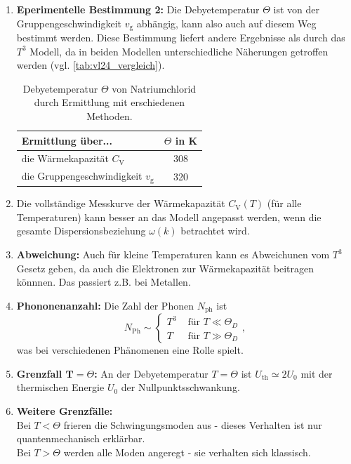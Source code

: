\begin{enumerate}
\begin{table}[H]
\begin{tabular}{ccc}
				\bottomrule
			\end{tabular}
		\end{table}
	\item \textbf{Eperimentelle Bestimmung 2:} Die Debyetemperatur $\Theta$ ist von der Gruppengeschwindigkeit $v_\mathrm g$ abhängig, kann also auch auf diesem Weg bestimmt werden. 
		Diese Bestimmung liefert andere Ergebnisse als durch das $T^3$ Modell, da in beiden Modellen unterschiedliche Näherungen getroffen werden (vgl. \autoref{tab:vl24_vergleich}).
		\begin{table}[H]
			\centering
			\caption{Debyetemperatur $\Theta$ von Natriumchlorid  durch Ermittlung mit erschiedenen Methoden.}
			\label{tab:vl24_vergleich}
			\begin{tabular}{lc}
				\toprule
				Ermittlung über... & $\Theta$ in K\\
				\midrule
				die Wärmekapazität $C_\mathrm V$ & 308\\
				die Gruppengeschwindigkeit $v_\mathrm g$ & 320\\
				\bottomrule
			\end{tabular}
		\end{table}
		
	\item Die vollständige Messkurve der Wärmekapazität $C_\mathrm V(T)$ (für alle Temperaturen) kann besser an das Modell angepasst werden, wenn die gesamte Dispersionsbeziehung $\omega(k)$ betrachtet wird.
	\item \textbf{Abweichung:} Auch für kleine Temperaturen kann es Abweichunen vom $T^3$ Gesetz geben, da auch die Elektronen zur Wärmekapazität beitragen könnnen. Das passiert z.B. bei Metallen.
	\item \textbf{Phononenanzahl:} Die Zahl der Phonen $N_\mathrm{ph}$ ist
			$$
			N_{\text{Ph}} \sim 
			\begin{cases}
				T^3 &\text{~für~} T\ll \Theta_{D} \\
				T & \text{~für~} T\gg \Theta_{D}
			\end{cases},
			$$ 
			was bei verschiedenen Phänomenen eine Rolle spielt.
	\item \textbf{Grenzfall $\bm T=\Theta$:} An der Debyetemperatur $T=\Theta$ ist $U_{\text{th}}\simeq 2 U_{0}$ mit der thermischen Energie $U_0$ der Nullpunktsschwankung.
	\item \textbf{Weitere Grenzfälle:} \\
	Bei $T<\Theta$ frieren die Schwingungsmoden aus - dieses Verhalten ist nur quantenmechanisch erklärbar.\\
	Bei $T > \Theta$ werden alle Moden angeregt - sie verhalten sich klassisch.
\end{enumerate} 


